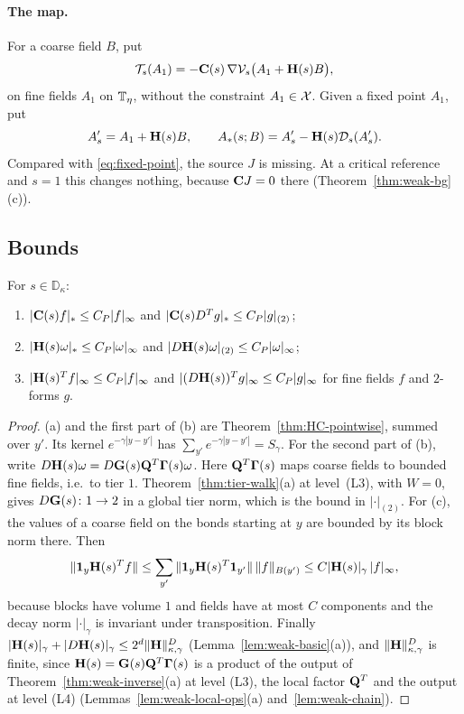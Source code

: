 \paragraph{The map.} For a coarse field $B$, put
\begin{equation}\label{eq:Ts}
\mathcal T_s(A_1)=-\mathbf C(s)\,\nabla\mathcal V_s\big(A_1+\mathbf H(s)B\big),
\end{equation}
on fine fields $A_1$ on $\mathbb T_\eta$, without the constraint $A_1\in\mathcal X$. Given a fixed point $A_1$, put
\[
A'_s=A_1+\mathbf H(s)B,\qquad A_*(s;B)=A'_s-\mathbf H(s)\mathcal D_s(A'_s).
\]
Compared with \eqref{eq:fixed-point}, the source $J$ is missing. At a critical reference and $s=1$ this changes nothing, because $\mathbf C J=0$ there (Theorem~\ref{thm:weak-bg}(c)).

\subsection{Bounds}\label{ss:45.3}

\begin{lemma}\label{lem:weak-bg-linear}
For $s\in\mathbb D_\kappa$:
\begin{enumerate}[label=(\alph*)]
\item $|\mathbf C(s)f|_*\le C_P|f|_\infty$ and $|\mathbf C(s)D^Tg|_*\le C_P|g|_{(2)}$;
\item $|\mathbf H(s)\omega|_*\le C_P|\omega|_\infty$ and $|D\mathbf H(s)\omega|_{(2)}\le C_P|\omega|_\infty$;
\item $|\mathbf H(s)^Tf|_\infty\le C_P|f|_\infty$ and $|(D\mathbf H(s))^Tg|_\infty\le C_P|g|_\infty$ for fine fields $f$ and $2$-forms $g$.
\end{enumerate}
\end{lemma}

\begin{proof}
(a) and the first part of (b) are Theorem~\ref{thm:HC-pointwise}, summed over $y'$. Its kernel $e^{-\gamma|y-y'|}$ has $\sum_{y'}e^{-\gamma|y-y'|}=S_\gamma$. For the second part of (b), write $D\mathbf H(s)\omega=D\mathbf G(s)\mathbf Q^T\boldsymbol\Gamma(s)\omega$. Here $\mathbf Q^T\boldsymbol\Gamma(s)$ maps coarse fields to bounded fine fields, i.e.\ to tier $1$. Theorem~\ref{thm:tier-walk}(a) at level~(L3), with $W=0$, gives $D\mathbf G(s)\colon1\to2$ in a global tier norm, which is the bound in $|\cdot|_{(2)}$. For (c), the values of a coarse field on the bonds starting at $y$ are bounded by its block norm there. Then
\[
\|\mathbf 1_y\mathbf H(s)^Tf\|\le\sum_{y'}\|\mathbf 1_y\mathbf H(s)^T\mathbf 1_{y'}\|\,\|f\|_{B(y')}\le C|\mathbf H(s)|_\gamma\,|f|_\infty ,
\]
because blocks have volume $1$ and fields have at most $C$ components and the decay norm $|\cdot|_\gamma$ is invariant under transposition. Finally $|\mathbf H(s)|_\gamma+|D\mathbf H(s)|_\gamma\le2^d\|\mathbf H\|^D_{\kappa,\gamma}$ (Lemma~\ref{lem:weak-basic}(a)), and $\|\mathbf H\|^D_{\kappa,\gamma}$ is finite, since $\mathbf H(s)=\mathbf G(s)\mathbf Q^T\boldsymbol\Gamma(s)$ is a product of the output of Theorem~\ref{thm:weak-inverse}(a) at level (L3), the local factor $\mathbf Q^T$ and the output at level (L4) (Lemmas~\ref{lem:weak-local-ops}(a) and~\ref{lem:weak-chain}).
\end{proof}

